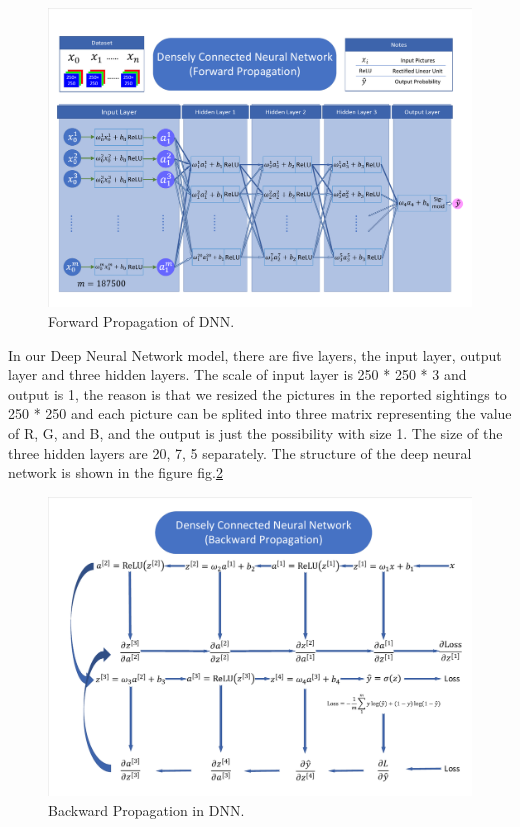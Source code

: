 \documentclass{mcmthesis}
\begin{document}
\begin{figure}[!htbp]
	\centering
 	\includegraphics[width = 1\textwidth]{DCNN-F.pdf} 
	\caption{Forward Propagation of DNN.}
	\label{fig:DNN}
\end{figure}
 In our Deep Neural  Network model, there are five layers, the input layer, output layer and three hidden layers. The scale of input layer is 250 * 250 * 3 and output is 1, the reason is that we resized the pictures in the reported sightings to 250 * 250 and each picture can be splited into three matrix representing the value of R, G, and B, and the output is just the possibility with size 1. The size of the three hidden layers are 20, 7, 5 separately. The structure of the deep neural network is shown in the figure fig.\ref{fig:DNN}

\begin{figure}[!htbp]
	\centering
 	\includegraphics[width = 1\textwidth]{DCNN-B.pdf} 
	\caption{Backward Propagation in DNN.}
	\label{fig:DNN}
\end{figure}
\end{document}
